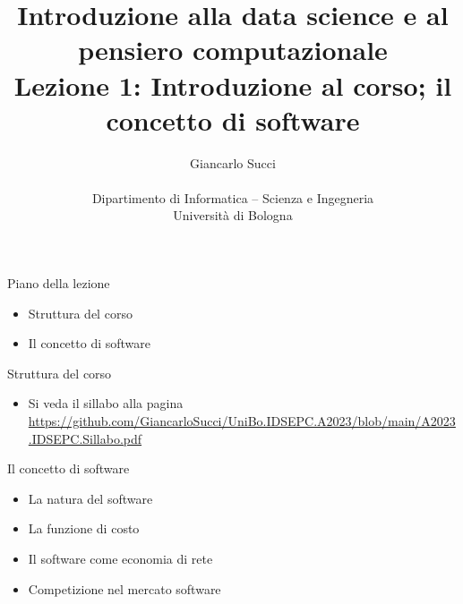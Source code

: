 \documentclass{beamer}
\title[L01]{Introduzione alla data science e al pensiero computazionale\\
Lezione 1: Introduzione al corso; il concetto di software} %
\author[{\tiny Giancarlo Succi }]{Giancarlo Succi\\\\ Dipartimento di Informatica -- Scienza e Ingegneria\\Universit\`{a} di Bologna\\
\bftt{g.succi@unibo.it}
} %
\institute[unibo] %
\date{} %
\begin{document}
\begin{frame}
\titlepage %

\end{frame}




\begin{frame}
{\centerline{Piano della lezione}}
\begin{itemize}
    \item Struttura del corso
    \item Il concetto di software
\end{itemize} 
\end{frame}

\begin{frame}
{\centerline{Struttura del corso}}
\begin{itemize}
    \item Si veda il sillabo alla pagina \url{https://github.com/GiancarloSucci/UniBo.IDSEPC.A2023/blob/main/A2023.IDSEPC.Sillabo.pdf}
\end{itemize} 
\end{frame}


\begin{frame}
{\centerline{Il concetto di software}}
\begin{itemize}
    \item La natura del software
    \item La funzione di costo
    \item Il software come economia di rete 
    \item Competizione nel mercato software
\end{itemize} 
\end{frame}
\end{document}
